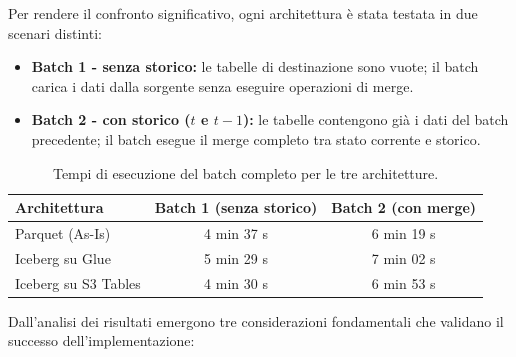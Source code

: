 \documentclass[12pt,a4paper,openright,twoside]{book}
\begin{document}
Per rendere il confronto significativo, ogni architettura è stata testata in due scenari distinti:

\begin{itemize}
    \item \textbf{Batch 1 - senza storico:} le tabelle di destinazione sono vuote; il batch carica i dati dalla sorgente senza eseguire operazioni di merge.
    \item \textbf{Batch 2 - con storico ($t$ e $t{-}1$):} le tabelle contengono già i dati del batch precedente; il batch esegue il merge completo tra stato corrente e storico.
\end{itemize}

\begin{table}[H]
\centering
\small
\caption{Tempi di esecuzione del batch completo per le tre architetture.}
\label{tab:benchmark}
\renewcommand{\arraystretch}{1.4}
\begin{tabular}{lcc}
\toprule
\textbf{Architettura} & \textbf{Batch 1 (senza storico)} & \textbf{Batch 2 (con merge)} \\
\midrule
Parquet (As-Is)       & 4 min 37 s & 6 min 19 s \\
Iceberg su Glue       & 5 min 29 s & 7 min 02 s \\
Iceberg su S3 Tables  & 4 min 30 s & 6 min 53 s \\
\bottomrule
\end{tabular}
\end{table}

Dall'analisi dei risultati emergono tre considerazioni fondamentali che validano il successo dell'implementazione:
\end{document}
